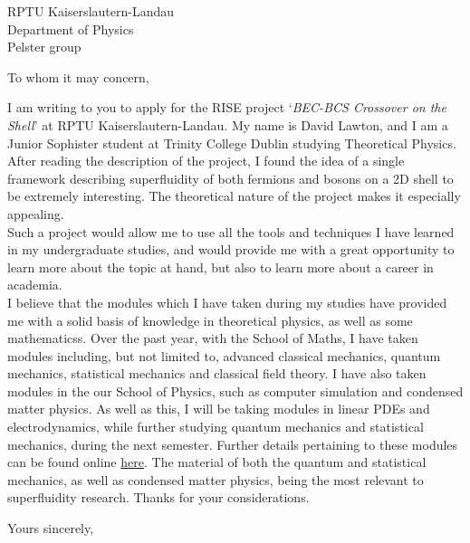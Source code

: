 \documentclass{letter}
\begin{document}
\begin{letter}{RPTU Kaiserslautern-Landau\\
    Department of Physics\\
    Pelster group\\}

\opening{To whom it may concern,}
I am writing to you to apply for the RISE project `\textit{BEC-BCS Crossover on the Shell}' at RPTU Kaiserslautern-Landau. My name is David Lawton, and I am a Junior Sophister student at Trinity College Dublin studying Theoretical Physics. After reading the description of the project, I found the idea of a single framework describing superfluidity of both fermions and bosons on a 2D shell to be extremely interesting. The theoretical nature of the project makes it especially appealing.\\

Such a project would allow me to use all the tools and techniques I have learned in my undergraduate studies, and would provide me with a great opportunity to learn more about the topic at hand, but also to learn more about a career in academia.\\

I believe that the modules which I have taken during my studies have provided me with a solid basis of knowledge in theoretical physics, as well as some mathematicss. Over the past year, with the School of Maths, I have taken modules including, but not limited to, advanced classical mechanics, quantum mechanics, statistical mechanics and classical field theory. I have also taken modules in the our School of Physics, such as computer simulation and condensed matter physics. As well as this, I will be taking modules in linear PDEs and electrodynamics, while further studying quantum mechanics and statistical mechanics, during the next semester. Further details pertaining to these modules can be found online \href{https://www.maths.tcd.ie/undergraduate/modules/jstp.php}{here}. The material of both the quantum and statistical mechanics, as well as condensed matter physics, being the most relevant to superfluidity research. Thanks for your considerations.\\

\closing{Yours sincerely,}

\end{letter}
\end{document}
